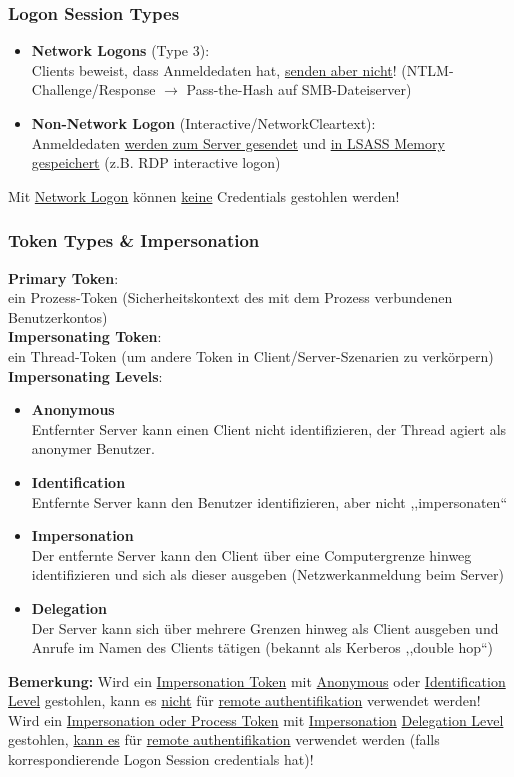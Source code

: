\subsubsection{Logon Session Types}
\begin{itemize}
    \item \textbf{Network Logons} (Type 3):\\
    Clients beweist, dass Anmeldedaten hat, \underline{senden aber nicht}! (NTLM-Challenge/Response $\rightarrow$ Pass-the-Hash auf SMB-Dateiserver)
    \item \textbf{Non-Network Logon} (Interactive/NetworkCleartext):\\
    Anmeldedaten \underline{werden zum Server gesendet} und \underline{in LSASS Memory} \underline{gespeichert} (z.B. RDP interactive logon)
\end{itemize}
Mit \underline{Network Logon} können \underline{keine} Credentials gestohlen werden!

\subsubsection{Token Types \& Impersonation}
\textbf{Primary Token}:\\
ein Prozess-Token (Sicherheitskontext des mit dem Prozess verbundenen Benutzerkontos)\\
\textbf{Impersonating Token}:\\
ein Thread-Token (um andere Token in Client/Server-Szenarien zu verkörpern)\\
\textbf{Impersonating Levels}:
\begin{itemize}
    \item \textbf{Anonymous}\\
    Entfernter Server kann einen Client nicht identifizieren, der Thread agiert als anonymer Benutzer.
    \item \textbf{Identification}\\
    Entfernte Server kann den Benutzer identifizieren, aber nicht ,,impersonaten``
    \item \textbf{Impersonation}\\
    Der entfernte Server kann den Client über eine Computergrenze hinweg identifizieren und sich als dieser ausgeben (Netzwerkanmeldung beim Server)
    \item \textbf{Delegation}\\
    Der Server kann sich über mehrere Grenzen hinweg als Client ausgeben und Anrufe im Namen des Clients tätigen (bekannt als Kerberos ,,double hop``)
\end{itemize}
\textbf{Bemerkung:}
Wird ein \underline{Impersonation Token} mit \underline{Anonymous} oder \underline{Identification Level} gestohlen, kann es \underline{nicht} für \underline{remote authentifikation} verwendet werden! \\
Wird ein \underline{Impersonation oder Process Token} mit \underline{Impersonation} \underline{Delegation Level} gestohlen, \underline{kann es} für \underline{remote authentifikation} verwendet werden (falls korrespondierende Logon Session credentials hat)!

